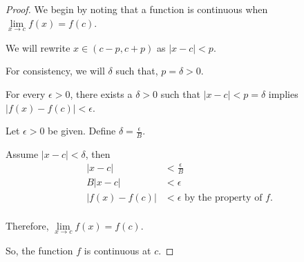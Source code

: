 \documentclass[../m134a-hw2.tex]{subfiles}
\begin{document}
\begin{proof}
    We begin by noting that a function is continuous when $\lim\limits_{x \to c} f(x) = f(c)$.
    
    We will rewrite $x \in (c-p,c+p)$ as $|x-c|<p$.

    For consistency, we will $\delta$ such that, $p = \delta > 0$.

    For every $\epsilon>0$, there exists a $\delta>0$ such that $|x-c|<p=\delta$ implies $|f(x)-f(c)|<\epsilon$.

    Let $\epsilon>0$ be given. Define $\delta = \frac{\epsilon}{B}$.

    Assume $|x-c|<\delta$, then
    \begin{align*}
        |x-c| &< \frac{\epsilon}{B} \\
        B|x-c| &< \epsilon \\
        |f(x)-f(c)| &< \epsilon \text{ by the property of $f$.}\\
    \end{align*}

    Therefore, $\lim\limits_{x \to c} f(x) = f(c)$.

    So, the function $f$ is continuous at $c$.
\end{proof}
\end{document}
